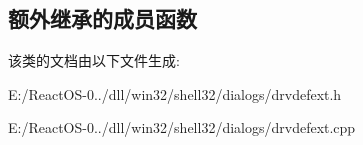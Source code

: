 \subsection*{额外继承的成员函数}


该类的文档由以下文件生成\+:\begin{DoxyCompactItemize}
\item 
E\+:/\+React\+O\+S-\/0../dll/win32/shell32/dialogs/drvdefext.\+h\item 
E\+:/\+React\+O\+S-\/0../dll/win32/shell32/dialogs/drvdefext.\+cpp\end{DoxyCompactItemize}
